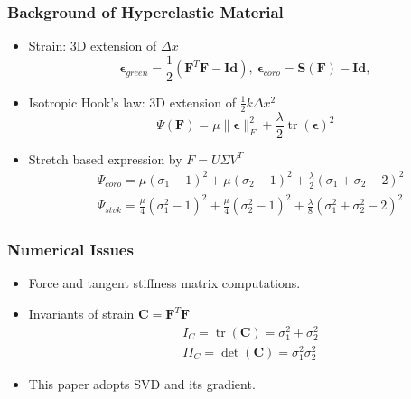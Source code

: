 \documentclass[serif,mathserif]{beamer}
\newcommand{\BOLD}[1]{\mathbf{#1}}
\newcommand{\BOLDG}[1]{\boldsymbol{#1}}
\DeclareMathOperator{\tr}{tr}
\begin{document}
\begin{frame}
  \frametitle{Background of Hyperelastic Material}
  \begin{itemize}
  \item Strain: 3D extension of $\Delta x$
    \begin{equation*}
      \BOLDG{\epsilon}_{green} = \frac{1}{2}(\BOLD{F}^T\BOLD{F}-\BOLD{Id}),~\BOLDG{\epsilon}_{coro} = \BOLD{S}(\BOLD{F})-\BOLD{Id},
    \end{equation*}
    \pause
  \item Isotropic Hook's law: 3D extension of $\frac{1}{2}k\Delta x^2$
    \begin{equation*}
      \Psi(\BOLD{F}) = \mu\|\BOLDG{\epsilon}\|_F^2 + \frac{\lambda}{2}\tr(\BOLDG{\epsilon})^2
    \end{equation*}
    \pause
  \item Stretch based expression by $F = U\Sigma V^T$
    \begin{equation*}
      \begin{split}
        &\Psi_{coro} = \mu(\sigma_1-1)^2+\mu(\sigma_2-1)^2+\frac{\lambda}{2}(\sigma_1+\sigma_2-2)^2 \\
        &\Psi_{stvk} = \frac{\mu}{4}(\sigma_1^2-1)^2+\frac{\mu}{4}(\sigma_2^2-1)^2+\frac{\lambda}{8}(\sigma_1^2+\sigma_2^2-2)^2 
      \end{split}
    \end{equation*}
  \end{itemize}
\end{frame}

\begin{frame}
  \frametitle{Numerical Issues}
  \begin{itemize}
  \item Force and tangent stiffness matrix computations.
    \pause
  \item Invariants of strain $\BOLD{C} = \BOLD{F}^T\BOLD{F}$
    \begin{equation*}
     \begin{split}
      &I_C = \tr(\BOLD{C}) =  \sigma_1^2+ \sigma_2^2 \\
      &II_C = \det(\BOLD{C}) = \sigma_1^2\sigma_2^2
     \end{split}
    \end{equation*}
    \pause
  \item This paper adopts SVD and its gradient.
  \end{itemize}
\end{frame}
\end{document}

